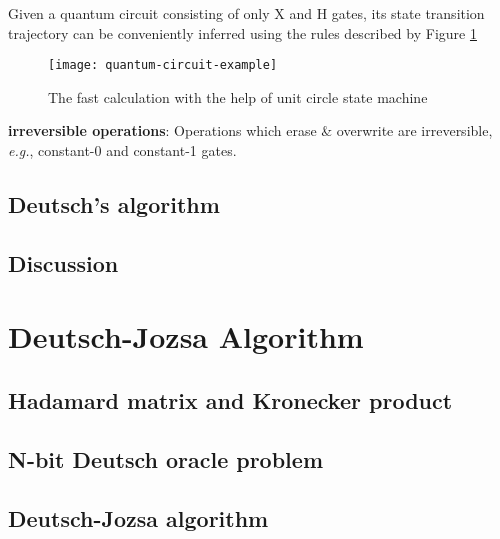 \documentclass{easyclass}
\begin{document}
Given a quantum circuit consisting of only X and H gates, its state transition trajectory can be conveniently inferred using the rules described by Figure \ref{fig:quantum circuit example} 
\begin{figure}[h]
	\centering
	\texttt{[image: quantum-circuit-example]}
	\caption{The fast calculation with the help of unit circle state machine}
	\label{fig:quantum circuit example}
\end{figure}


\textbf{irreversible operations}: Operations which erase \& overwrite are irreversible, \textit{e.g.}, constant-0 and constant-1 gates.




\subsection{Deutsch's algorithm}
\subsection{Discussion}

\section{Deutsch-Jozsa Algorithm}	
\subsection{Hadamard matrix and Kronecker product}
\subsection{N-bit Deutsch oracle problem}
\subsection{Deutsch-Jozsa algorithm}
	
	
	
	
\ifx\flag\undefined
	
\end{document}
